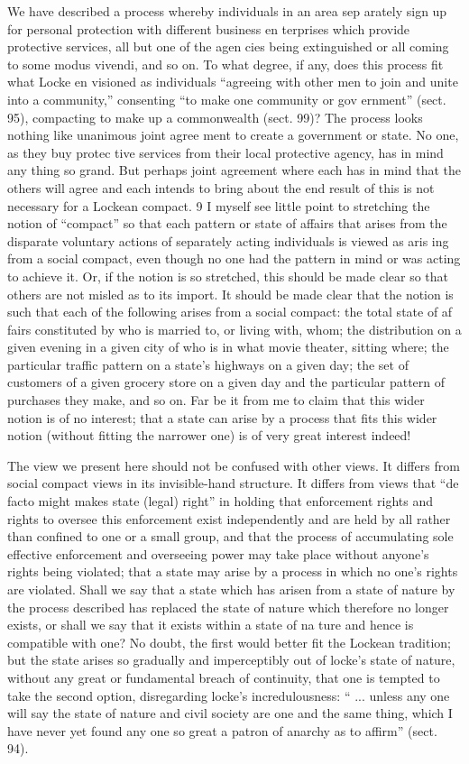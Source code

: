 \documentclass[11pt,openany]{book}
\begin{document}
We have described a process whereby individuals in an area sep arately sign up for personal protection with different business en terprises which provide protective services, all but one of the agen cies being extinguished or all coming to some modus vivendi, and so on. To what degree, if any, does this process fit what Locke en visioned as individuals ``agreeing with other men to join and unite into a community,'' consenting ``to make one community or gov ernment'' (sect. 95), compacting to make up a commonwealth (sect. 99)? The process looks nothing like unanimous joint agree ment to create a government or state. No one, as they buy protec tive services from their local protective agency, has in mind any thing so grand. But perhaps joint agreement where each has in mind that the others will agree and each intends to bring about the end result of this is not necessary for a Lockean compact. 9 I myself see little point to stretching the notion of ``compact'' so that each pattern or state of affairs that arises from the disparate voluntary actions of separately acting individuals is viewed as aris ing from a social compact, even though no one had the pattern in mind or was acting to achieve it. Or, if the notion is so stretched, this should be made clear so that others are not misled as to its import. It should be made clear that the notion is such that each of the following arises from a social compact: the total state of af fairs constituted by who is married to, or living with, whom; the distribution on a given evening in a given city of who is in what movie theater, sitting where; the particular traffic pattern on a state's highways on a given day; the set of customers of a given grocery store on a given day and the particular pattern of purchases they make, and so on. Far be it from me to claim that this wider notion is of no interest; that a state can arise by a process that fits this wider notion (without fitting the narrower one) is of very great interest indeed! 

The view we present here should not be confused with other views. It differs from social compact views in its invisible-hand structure. It differs from views that ``de facto might makes state (legal) right'' in holding that enforcement rights and rights to oversee this enforcement exist independently and are held by all rather than confined to one or a small group, and that the process of accumulating sole effective enforcement and overseeing power may take place without anyone's rights being violated; that a state may arise by a process in which no one's rights are violated. Shall we say that a state which has arisen from a state of nature by the process described has replaced the state of nature which therefore no longer exists, or shall we say that it exists within a state of na ture and hence is compatible with one? No doubt, the first would better fit the Lockean tradition; but the state arises so gradually and imperceptibly out of locke's state of nature, without any great or fundamental breach of continuity, that one is tempted to take the second option, disregarding locke's incredulousness: `` ... unless any one will say the state of nature and civil society are one and the same thing, which I have never yet found any one so great a patron of anarchy as to affirm'' (sect. 94). 
\end{document}
